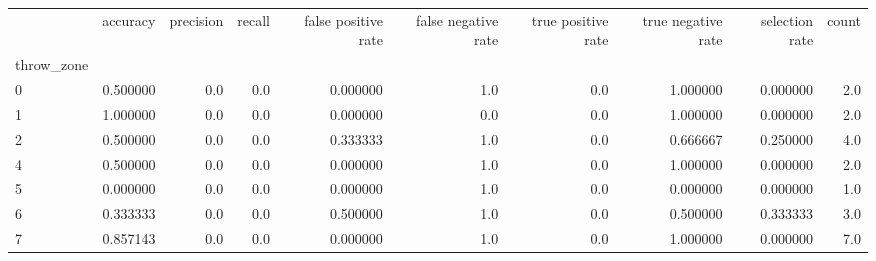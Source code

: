 \begin{tabular}{lrrrrrrrrr}
\toprule
{} &  accuracy &  precision &  recall &  false positive rate &  false negative rate &  true positive rate &  true negative rate &  selection rate &  count \\
throw\_zone &           &            &         &                      &                      &                     &                     &                 &        \\
\midrule
0          &  0.500000 &        0.0 &     0.0 &             0.000000 &                  1.0 &                 0.0 &            1.000000 &        0.000000 &    2.0 \\
1          &  1.000000 &        0.0 &     0.0 &             0.000000 &                  0.0 &                 0.0 &            1.000000 &        0.000000 &    2.0 \\
2          &  0.500000 &        0.0 &     0.0 &             0.333333 &                  1.0 &                 0.0 &            0.666667 &        0.250000 &    4.0 \\
4          &  0.500000 &        0.0 &     0.0 &             0.000000 &                  1.0 &                 0.0 &            1.000000 &        0.000000 &    2.0 \\
5          &  0.000000 &        0.0 &     0.0 &             0.000000 &                  1.0 &                 0.0 &            0.000000 &        0.000000 &    1.0 \\
6          &  0.333333 &        0.0 &     0.0 &             0.500000 &                  1.0 &                 0.0 &            0.500000 &        0.333333 &    3.0 \\
7          &  0.857143 &        0.0 &     0.0 &             0.000000 &                  1.0 &                 0.0 &            1.000000 &        0.000000 &    7.0 \\
\bottomrule
\end{tabular}
